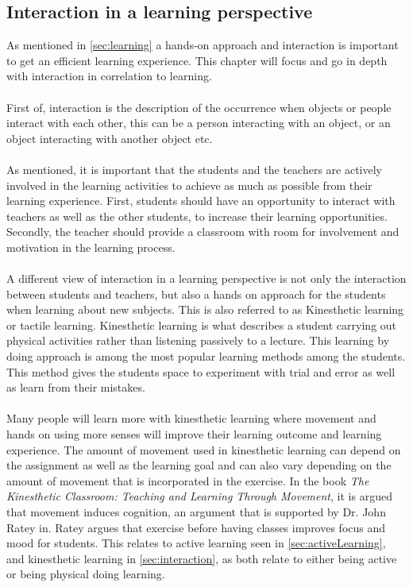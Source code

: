 \subsection{Interaction in a learning perspective}\label{sec:interaction} 
As mentioned in \autoref{sec:learning} a hands-on approach and interaction is important to get an efficient learning experience. This chapter will focus and go in depth with interaction in correlation to learning.\\
\\
First of, interaction is the description of the occurrence when objects or people interact with each other, this can be a person interacting with an object, or an object interacting with another object etc.\\
\\
As mentioned, it is important that the students and the teachers are actively involved in the learning activities to achieve as much as possible from their learning experience. First, students should have an opportunity to interact with teachers as well as the other students, to increase their learning opportunities. Secondly, the teacher should provide a classroom with room for involvement and motivation in the learning process\cite{interactionlearning}.\\
\\
A different view of interaction in a learning perspective is not only the interaction between students and teachers, but also a hands on approach for the students when learning about new subjects. This is also referred to as Kinesthetic learning or tactile learning. Kinesthetic learning is what describes a student carrying out physical activities rather than listening passively to a lecture. This learning by doing approach is among the most popular learning methods among the students. This method gives the students space to experiment with trial and error as well as learn from their mistakes.\cite{kinest} \\
\\
Many people will learn more with kinesthetic learning where movement and hands on using more senses will improve their learning outcome and learning experience. The amount of movement used in kinesthetic learning can depend on the assignment as well as the learning goal and can also vary depending on the amount of movement that is incorporated in the exercise.	In the book \textit{The Kinesthetic Classroom: Teaching and Learning Through Movement}\cite{kinestheticMovement}, it is argued that movement induces cognition, an argument that is supported by Dr. John Ratey in\cite{rateySpark}. Ratey argues that exercise before having classes improves focus and mood for students\cite[p.~33]{rateySpark}. This relates to active learning seen in \autoref{sec:activeLearning}, and kinesthetic learning in \autoref{sec:interaction}, as both relate to either being active or being physical doing learning.\\

